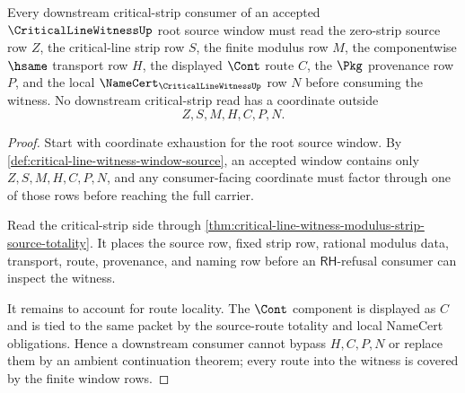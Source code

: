 \begin{theorem}
\label{thm:critical-line-witness-continuation-route-coverage}
Every downstream critical-strip consumer of an accepted
$\CriticalLineWitnessUp$ root source window must read the zero-strip source row
$Z$, the critical-line strip row $S$, the finite modulus row $M$, the
componentwise $\hsame$ transport row $H$, the displayed $\Cont$ route $C$, the
$\Pkg$ provenance row $P$, and the local $\NameCert_{\CriticalLineWitnessUp}$
row $N$ before consuming the witness. No downstream critical-strip read has a
coordinate outside
$$
Z,S,M,H,C,P,N.
$$
\end{theorem}
\begin{proof}
Start with coordinate exhaustion for the root source window. By
\autoref{def:critical-line-witness-window-source}, an accepted window contains
only $Z,S,M,H,C,P,N$, and any consumer-facing coordinate must factor through
one of those rows before reaching the full carrier.

Read the critical-strip side through
\autoref{thm:critical-line-witness-modulus-strip-source-totality}. It places
the source row, fixed strip row, rational modulus data, transport, route,
provenance, and naming row before an $\mathsf{RH}$-refusal consumer can
inspect the witness.

It remains to account for route locality. The $\Cont$ component is displayed
as $C$ and is tied to the same packet by the source-route totality and local
NameCert obligations. Hence a downstream consumer cannot bypass $H,C,P,N$ or
replace them by an ambient continuation theorem; every route into the witness
is covered by the finite window rows.
\end{proof}
